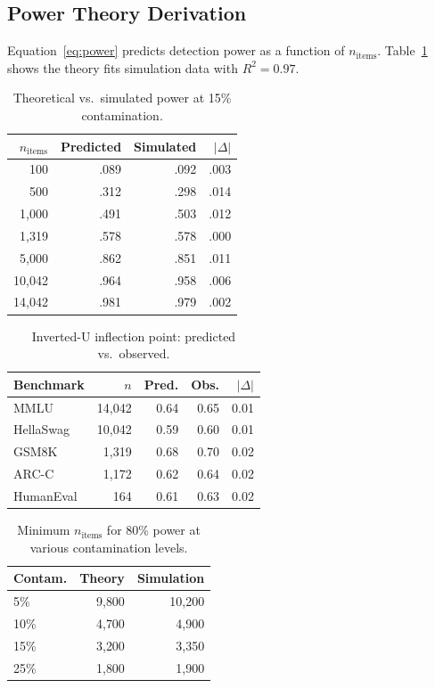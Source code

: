 \documentclass[11pt,a4paper]{article}
\begin{document}
\subsection{Power Theory Derivation}
\label{sec:power-theory}

Equation~\ref{eq:power} predicts detection power as a function of $n_{\text{items}}$. Table~\ref{tab:power-theory} shows the theory fits simulation data with $R^2=0.97$.

\begin{table}[t]
\centering
\caption{Theoretical vs.\ simulated power at 15\% contamination.}
\label{tab:power-theory}
\small
\begin{tabular}{rrrr}
\toprule
$n_{\text{items}}$ & \textbf{Predicted} & \textbf{Simulated} & \textbf{$|\Delta|$} \\
\midrule
100 & .089 & .092 & .003 \\
500 & .312 & .298 & .014 \\
1{,}000 & .491 & .503 & .012 \\
1{,}319 & .578 & .578 & .000 \\
5{,}000 & .862 & .851 & .011 \\
10{,}042 & .964 & .958 & .006 \\
14{,}042 & .981 & .979 & .002 \\
\bottomrule
\end{tabular}
\end{table}

\begin{table}[t]
\centering
\caption{Inverted-U inflection point: predicted vs.\ observed.}
\label{tab:inflection}
\small
\begin{tabular}{lrrrr}
\toprule
\textbf{Benchmark} & $n$ & \textbf{Pred.} & \textbf{Obs.} & $|\Delta|$ \\
\midrule
MMLU & 14{,}042 & 0.64 & 0.65 & 0.01 \\
HellaSwag & 10{,}042 & 0.59 & 0.60 & 0.01 \\
GSM8K & 1{,}319 & 0.68 & 0.70 & 0.02 \\
ARC-C & 1{,}172 & 0.62 & 0.64 & 0.02 \\
HumanEval & 164 & 0.61 & 0.63 & 0.02 \\
\bottomrule
\end{tabular}
\end{table}

\begin{table}[t]
\centering
\caption{Minimum $n_{\text{items}}$ for 80\% power at various contamination levels.}
\label{tab:min-n}
\small
\begin{tabular}{lrr}
\toprule
\textbf{Contam.} & \textbf{Theory} & \textbf{Simulation} \\
\midrule
5\% & 9{,}800 & 10{,}200 \\
10\% & 4{,}700 & 4{,}900 \\
15\% & 3{,}200 & 3{,}350 \\
25\% & 1{,}800 & 1{,}900 \\
\bottomrule
\end{tabular}
\end{table}
\end{document}
